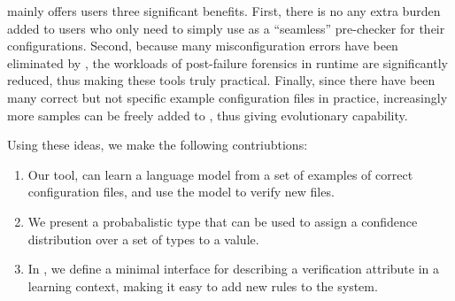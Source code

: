 \app mainly offers users three significant benefits.
First, there is no any extra burden added to users who only need to 
simply use \app as a ``seamless'' pre-checker for their configurations.
Second, because many misconfiguration errors have been eliminated 
by \app, the workloads of post-failure forensics in runtime
are significantly reduced, thus making these tools truly practical.
Finally, since there have been many correct but not specific 
example configuration files in practice, 
increasingly more samples can be freely added to \app,
thus giving \app evolutionary capability.

Using these ideas, we make the following contriubtions:

\begin{enumerate}

  \item Our tool, \app can learn a language model from a set of examples of correct configuration files, and use the model to verify new files.
  \item We present a probabalistic type that can be used to assign a confidence distribution over a set of types to a valule.
  \item In \app, we define a minimal interface for describing a verification attribute in a learning context, making it easy to add new rules to the system.

\end{enumerate}
